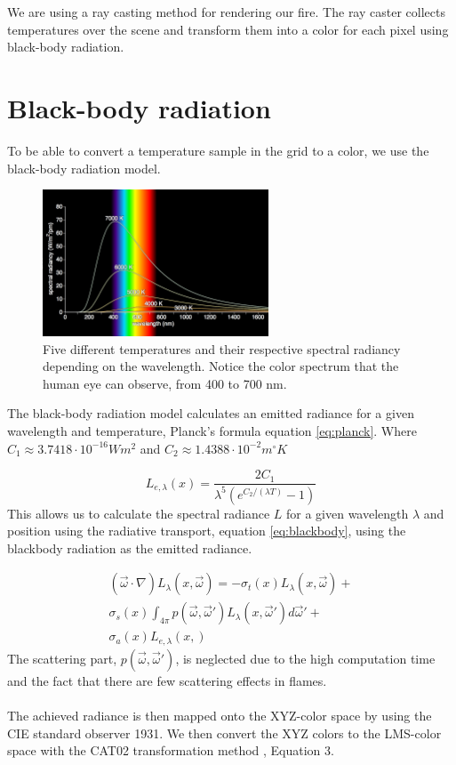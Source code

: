 We are using a ray casting method for rendering our fire. The ray caster collects temperatures over the scene and transform them into a color for each pixel using black-body radiation.
\section{Black-body radiation}
	To be able to convert a temperature sample in the grid to a color, we use the black-body radiation model. 


\begin{figure}[h!]
\label{fig:blackbody}
\centering
\includegraphics[width=0.6\textwidth]{blackbody.png}
\caption{Five different temperatures and their respective spectral radiancy depending on the wavelength. Notice the color spectrum that the human eye can observe, from 400 to 700 nm.}
\end{figure}

The black-body radiation model calculates an emitted radiance for a given wavelength and temperature, Planck's formula\cite{Nguyen02} equation \ref{eq:planck}. Where $C_1 \approx 3.7418 \cdot 10^{-16} Wm^2$ and $C_2 \approx 1.4388 \cdot 10^{-2} m^\circ K$

\begin{equation}
\label{eq:planck}
	L_{e,\lambda}(x) = \frac{2C_1}{\lambda^5(e^{C_2/(\lambda T)}-1)}
\end{equation}
This allows us to calculate the spectral radiance $L$ for a given wavelength $\lambda$ and position using the radiative transport, equation \ref{eq:blackbody}, using the blackbody radiation as the emitted radiance. 

\begin{equation}
\label{eq:blackbody}
\begin{split}
	(\vec{\omega}\cdot \nabla)L_\lambda(x,\vec{\omega}) = -\sigma_t(x)L_\lambda(x,\vec{\omega}) + \\ 
\sigma_s(x) \int_{4\pi} p(\vec{\omega},\vec{\omega}')L_\lambda(x,\vec{\omega}')d\vec{\omega}' + \\
\sigma_a(x)L_{e,\lambda}(x,)
\end{split}
\end{equation}
The scattering part, $ p(\vec{\omega},\vec{\omega}')$,  is neglected due to the high computation time and the fact that there are few scattering effects in flames. \\\\
The achieved radiance is then mapped onto the XYZ-color space by using the CIE standard observer 1931\cite{CIE}.
We then convert the XYZ colors to the LMS-color space with the CAT02 transformation method \cite{CAT02}, Equation 3.

